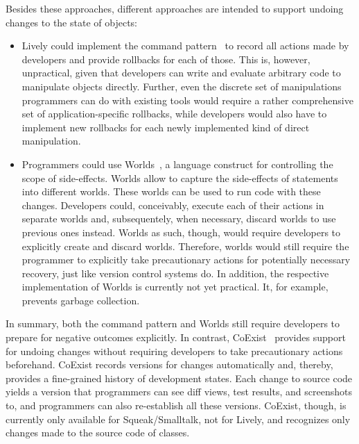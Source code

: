 Besides these approaches, different approaches are intended to support undoing changes to the state of objects:
\begin{itemize}
    \item Lively could implement the command pattern~\cite{GammaHelmJohnsonVlissides95} to record all actions made by developers and provide rollbacks for each of those. This is, however, unpractical, given that developers can write and evaluate arbitrary code to manipulate objects directly. Further, even the discrete set of manipulations programmers can do with existing tools would require a rather comprehensive set of application-specific rollbacks, while developers would also have to implement new rollbacks for each newly implemented kind of direct manipulation.
    \item Programmers could use Worlds~\cite{Warth2011Wor}, a language construct for controlling the scope of side-effects. Worlds allow to capture the side-effects of statements into different worlds. These worlds can be used to run code with these changes. Developers could, conceivably, execute each of their actions in separate worlds and, subsequentely, when necessary, discard worlds to use previous ones instead. Worlds as such, though, would require developers to explicitly create and discard worlds. Therefore, worlds would still require the programmer to explicitly take precautionary actions for potentially necessary recovery, just like version control systems do. In addition, the respective implementation of Worlds is currently not yet practical. It, for example, prevents garbage collection.
\end{itemize}

In summary, both the command pattern and Worlds still require developers to prepare for negative outcomes explicitly.
In contrast, CoExist~\cite{Steinert2012COE} provides support for undoing changes without requiring developers to take precautionary actions beforehand.
CoExist records versions for changes automatically and, thereby, provides a fine-grained history of development states.
Each change to source code yields a version that programmers can see diff views, test results, and screenshots to, and programmers can also re-establish all these versions. 
CoExist, though, is currently only available for Squeak/Smalltalk, not for Lively, and recognizes only changes made to the source code of classes.

